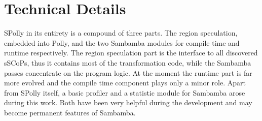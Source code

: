 
\chapter{Technical Details} %
\label{Chapter4}


SPolly in its entirety is a compound of three parts. The region speculation, 
embedded into Polly, and the two Sambamba modules  for compile time and
runtime respectively. The region speculation part is the interface
to all discovered sSCoPs, thus it contains most of the transformation code, 
while the Sambamba passes concentrate on the program logic. 
At the moment the runtime part is far more evolved and the compile time component
plays only a minor role. Apart from SPolly itself, a basic profiler and a
statistic module for Sambamba arose during this work. Both have been very helpful
during the development and may become permanent features of Sambamba.


